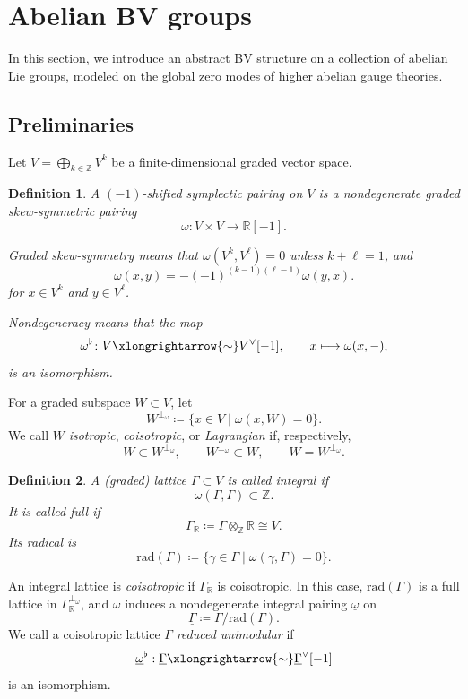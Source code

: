 \documentclass[12pt]{amsart}
\numberwithin{table}{section}
\numberwithin{equation}{section}
\newtheorem{defn}{Definition}[section]
\theoremstyle{plain}
\newcommand{\R}{\mathbb{R}}
\newcommand{\Z}{\mathbb{Z}}
\newcommand{\rad}{\mathrm{rad}}
\begin{document}
\section{Abelian BV groups}

In this section, we introduce an abstract BV structure on a collection of abelian Lie groups, modeled on the global zero modes of higher abelian gauge theories.

\subsection{Preliminaries}

Let $V = \bigoplus_{k\in \Z} V^k$ be a finite-dimensional graded vector space.

\begin{defn}
	A \emph{$(-1)$-shifted symplectic pairing} on $V$ is a nondegenerate graded skew-symmetric pairing
	\[
	\omega \colon V \times V \longrightarrow \R[-1].
	\]
	
	Graded skew-symmetry means that $\omega(V^k,V^\ell)=0$ unless $k+\ell=1$, and
	\[
	\omega(x,y)=-(-1)^{(k-1)(\ell-1)}\omega(y,x).
	\]
	for $x \in V^k$ and $y \in V^\ell$. 
	
	Nondegeneracy means that the map
	\[
	\omega^\flat \colon V \xlongrightarrow{\sim} V^\vee[-1],
	\qquad x\longmapsto\omega(x,-),
	\]
	is an isomorphism.
\end{defn}

For a graded subspace $W\subset V$, let
\[
W^{\perp_\omega} \coloneq \{x\in V\mid \omega(x,W)=0\}.
\]
We call $W$ \emph{isotropic}, \emph{coisotropic}, or \emph{Lagrangian} if, respectively,
\[
W\subset W^{\perp_\omega},
\qquad
W^{\perp_\omega}\subset W,
\qquad
W=W^{\perp_\omega}.
\]

\begin{defn}
	A (graded) lattice $\Gamma \subset V$ is called \emph{integral} if
	\[
	\omega(\Gamma,\Gamma)\subset\Z.
	\]
	It is called \emph{full} if
	\[
	\Gamma_\R \coloneqq  \Gamma\otimes_{\Z}\R \cong V.
	\]
    Its \emph{radical} is
	\[
	\rad(\Gamma)\coloneq\{\gamma\in\Gamma\mid \omega(\gamma,\Gamma)=0\}.
	\]
\end{defn}

An integral lattice is \emph{coisotropic} if $\Gamma_\R$ is coisotropic. In this case, $\rad(\Gamma)$ is a full lattice in $\Gamma_\R^{\perp_\omega}$, and $\omega$ induces a nondegenerate integral pairing $\underline\omega$ on
\[
\underline\Gamma \coloneq \Gamma/\rad(\Gamma).
\]
We call a coisotropic lattice $\Gamma$ \emph{reduced unimodular} if
\[
\underline \omega^\flat:
\underline\Gamma\xlongrightarrow{\sim}
\underline\Gamma^\vee[-1]
\]
is an isomorphism.
\end{document}
